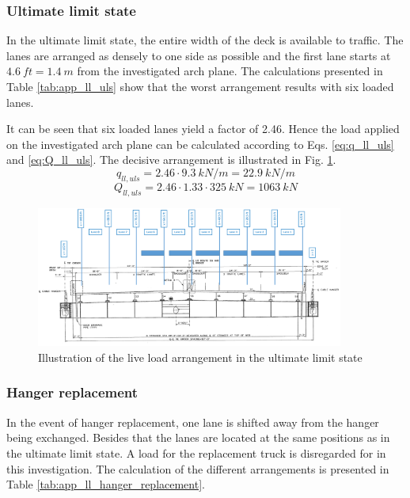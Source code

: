 \subsubsection{Ultimate limit state} \label{Appendx_A_Live_loading_1}
In the ultimate limit state, the entire width of the deck is available to traffic. The lanes are arranged as densely to one side as possible and the first lane starts at $\SI{4.6}{ft}=\SI{1.4}{m}$ from the investigated arch plane. The calculations presented in Table \ref{tab:app_ll_uls} show that the worst arrangement results with six loaded lanes. 



It can be seen that six loaded lanes yield a factor of 2.46. Hence the load applied on the investigated arch plane can be calculated according to Eqs. \eqref{eq:q_ll_uls} and \eqref{eq:Q_ll_uls}. The decisive arrangement is illustrated in Fig. \ref{fig:app_hangers_uls}.
\begin{equation}
    q_{ll, uls} = 2.46 \cdot \SI{9.3}{kN/m} = \SI{22.9}{kN/m}
    \label{eq:q_ll_uls}
\end{equation}
\begin{equation}
    Q_{ll, uls} = 2.46 \cdot 1.33 \cdot \SI{325}{kN} = \SI{1063}{kN}
    \label{eq:Q_ll_uls}
\end{equation}

\begin{figure}[H]
    \centering
    \includegraphics[width=0.9\textwidth]{overleaf/Appendix/Pictures/Cross_Section_LL_ULS.PNG}
    \caption{Illustration of the live load arrangement in the ultimate limit state}
    \label{fig:app_hangers_uls}
\end{figure}




\subsubsection{Hanger replacement} \label{Appendx_A_Live_loading_2}
In the event of hanger replacement, one lane is shifted away from the hanger being exchanged. Besides that the lanes are located at the same positions as in the ultimate limit state. A load for the replacement truck is disregarded for in this investigation. The calculation of the different arrangements is presented in Table \ref{tab:app_ll_hanger_replacement}.


